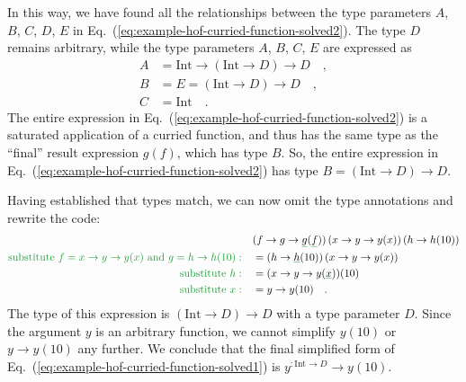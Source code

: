 In this way, we have found all the relationships between the type
parameters $A$, $B$, $C$, $D$, $E$ in Eq.~(\ref{eq:example-hof-curried-function-solved2}).
The type $D$ remains arbitrary, while the type parameters $A$, $B$,
$C$, $E$ are expressed as
\begin{align}
A & =\text{Int}\rightarrow\left(\text{Int}\rightarrow D\right)\rightarrow D\quad,\label{eq:example-hof-curried-solved3}\\
B & =E=\left(\text{Int}\rightarrow D\right)\rightarrow D\quad,\label{eq:example-hof-curried-solved4}\\
C & =\text{Int}\quad.\nonumber 
\end{align}
The entire expression in Eq.~(\ref{eq:example-hof-curried-function-solved2})
is a saturated application of a curried function, and thus has the
same type as the \textsf{``}final\textsf{''} result expression $g(f)$, which has
type $B$. So, the entire expression in Eq.~(\ref{eq:example-hof-curried-function-solved2})
has type $B=\left(\text{Int}\rightarrow D\right)\rightarrow D$.

Having established that types match, we can now omit the type annotations
and rewrite the code:
\begin{align*}
 & (f\rightarrow g\rightarrow\gunderline g(\gunderline f))\left(x\rightarrow y\rightarrow y(x)\right)\left(h\rightarrow h(10)\right)\\
{\color{greenunder}\text{substitute }f=x\rightarrow y\rightarrow y(x)\text{ and }g=h\rightarrow h(10):}\quad & =(h\rightarrow\gunderline h(10))\left(x\rightarrow y\rightarrow y(x)\right)\\
{\color{greenunder}\text{substitute }h:}\quad & =(x\rightarrow y\rightarrow y(\gunderline x))(10)\\
{\color{greenunder}\text{substitute }x:}\quad & =y\rightarrow y(10)\quad.
\end{align*}
The type of this expression is $\left(\text{Int}\rightarrow D\right)\rightarrow D$
with a type parameter $D$. Since the argument $y$ is an arbitrary
function, we cannot simplify $y(10)$ or $y\rightarrow y(10)$ any
further. We conclude that the final simplified form of Eq.~(\ref{eq:example-hof-curried-function-solved1})
is $y^{:\text{Int}\rightarrow D}\rightarrow y(10)$.

